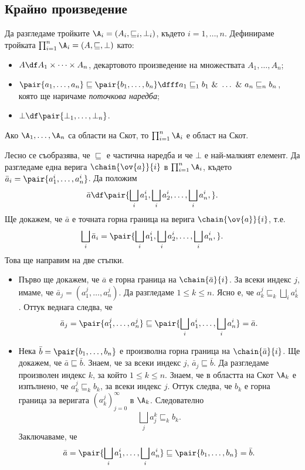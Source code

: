 \subsection{Крайно произведение}
\label{subsect:domains:product}

Да разгледаме тройките $\A_i = (A_i, \sqsubseteq_i, \bot_i)$, където $i = 1,\dots,n$. Дефинираме тройката 
$\prod^n_{i=1}\A_i = (A, \sqsubseteq, \bot)$ като:
\begin{itemize}
\item
  $A \df A_1\times\dots\times A_n$, декартовото произведение на множествата $A_1,\dots,A_n$;
\item 
  $\pair{a_1,\dots,a_n} \sqsubseteq \pair{b_1,\dots,b_n} \dfff a_1 \sqsubseteq_1 b_1\ \&\ \dots\ \&\ a_n \sqsubseteq_n b_n$,
  която ще наричаме {\em поточкова наредба};
\item
  $\bot \df \pair{\bot_1,\dots,\bot_n}$.
\end{itemize}

\begin{framed}
  \begin{prop}
    \label{pr:cartesian}
    Ако $\A_1,\dots,\A_n$ са области на Скот, то $\prod^n_{i=1}\A_i$ е област на Скот.
  \end{prop}  
\end{framed}
\begin{hint}
  Лесно се съобразява, че $\sqsubseteq$ е частична наредба и че $\bot$ е най-малкият елемент.
  Да разгледаме една верига $\chain{\ov{a}}{i}$ в $\prod^n_{i=1}\A_i$,
  където $\bar{a}_i = \pair{a^i_1,\dots,a^i_n}$.
  Да положим \[\bar{a} \df \pair{\bigsqcup_i a^i_1,\bigsqcup_i a^i_2,\ldots,\bigsqcup_i a^i_n,}.\]
  Ще докажем, че $\bar{a}$ е точната горна граница на верига $\chain{\ov{a}}{i}$, т.е.
  \[\bigsqcup_i\bar{a}_i = \pair{\bigsqcup_i a^i_1,\bigsqcup_i a^i_2,\ldots,\bigsqcup_i a^i_n,}.\]
  Това ще направим на две стъпки.
  \begin{itemize}
  \item 
    Първо ще докажем, че $\bar{a}$ е горна граница на $\chain{\bar{a}}{i}$.
    За всеки индекс $j$, имаме, че $\bar{a}_j = (a^j_1,\dots,a^j_n)$.
    Да разгледаме $1 \leq k \leq n$.
    Ясно е, че $a^j_k \sqsubseteq_k \bigsqcup_i a^i_k$.
    Оттук веднага следва, че
    \[\bar{a}_j = \pair{a^j_1,\dots,a^j_n} \sqsubseteq \pair{\bigsqcup_i a^i_1,\dots,\bigsqcup_i a^i_n} = \bar{a}.\]
  \item
    Нека $\bar{b} = \pair{b_1,\dots,b_n}$ е произволна горна граница на $\chain{\bar{a}}{i}$.
    Ще докажем, че $\bar{a} \sqsubseteq \bar{b}$.
    Знаем, че за всеки индекс $j$, $\bar{a}_j \sqsubseteq \bar{b}$.
    Да разгледаме произволен индекс $k$, за който $1 \leq k \leq n$.
    Знаем, че в областта на Скот $\A_k$ е изпълнено, че $a^j_k \sqsubseteq_k b_k$, за всеки индекс $j$.
    Оттук следва, че $b_k$ е горна граница за веригата $(a^j_k)^\infty_{j=0}$ в $\A_k$.
    Следователно
    \[\bigsqcup_j a^k_j \sqsubseteq_k b_k.\]
    Заключаваме, че
    \[\bar{a} = \pair{\bigsqcup_i a^i_1,\dots,\bigsqcup_i a^i_n} \sqsubseteq \pair{b_1,\dots,b_n} = \bar{b}.\]
  \end{itemize}
\end{hint}

